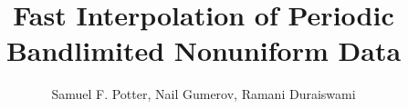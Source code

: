 \documentclass{article}
\title{Fast Interpolation of Periodic Bandlimited Nonuniform Data}
\author{Samuel F. Potter, Nail Gumerov, Ramani Duraiswami}
\begin{document}
\maketitle



\tableofcontents














\appendix


\clearpage
{}

\end{document}
